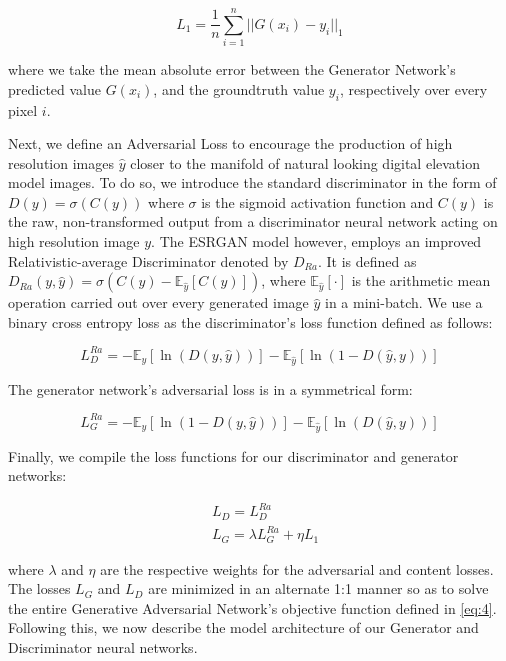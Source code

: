 \documentclass[tc, manuscript]{copernicus}
\begin{document}
\begin{equation}\label{eq:4}
  L_1 = \dfrac{1}{n} \sum\limits_{i=1}^n ||G(x_{i}) - y_i||_{1}
\end{equation}

where we take the mean absolute error between the Generator Network's predicted value $G(x_{i})$, and the groundtruth value $y_i$, respectively over every pixel $i$.

Next, we define an Adversarial Loss to encourage the production of high resolution images $\hat{y}$ closer to the manifold of natural looking digital elevation model images.
To do so, we introduce the standard discriminator in the form of $D(y) = \sigma(C(y))$ where $\sigma$ is the sigmoid activation function and $C(y)$ is the raw, non-transformed output from a discriminator neural network acting on high resolution image $y$.
The ESRGAN model \citep{WangESRGANEnhancedSuperResolution2018} however, employs an improved Relativistic-average Discriminator \citep{Jolicoeur-Martineaurelativisticdiscriminatorkey2018} denoted by $D_{Ra}$.
It is defined as $D_{Ra}(y,\hat{y}) = \sigma(C(y) - \mathbb{E}_{\hat{y}}[C(\hat{y})])$, where $\mathbb{E}_{\hat{y}}[\cdot]$ is the arithmetic mean operation carried out over every generated image $\hat{y}$ in a mini-batch.
We use a binary cross entropy loss as the discriminator's loss function defined as follows:

\begin{equation}\label{eq:5}
  L_D^{Ra} = - \mathbb{E}_y[\ln(D(y,\hat{y}))] - \mathbb{E}_{\hat{y}}[\ln(1 - D(\hat{y},y))]
\end{equation}

The generator network's adversarial loss is in a symmetrical form:

\begin{equation}\label{eq:6}
  L_G^{Ra} = - \mathbb{E}_y[\ln(1 - D(y,\hat{y}))] - \mathbb{E}_{\hat{y}}[\ln(D(\hat{y},y))]
\end{equation}

Finally, we compile the loss functions for our discriminator and generator networks:

\begin{align}
  & L_D = L_D^{Ra} \\
  & L_G = \lambda L_G^{Ra} + \eta L_1
\end{align}

where $\lambda$ and $\eta$ are the respective weights for the adversarial and content losses.
The losses $L_G$ and $L_D$ are minimized in an alternate 1:1 manner so as to solve the entire Generative Adversarial Network's objective function defined in \eqref{eq:4}.
Following this, we now describe the model architecture of our Generator and Discriminator neural networks.
\end{document}
